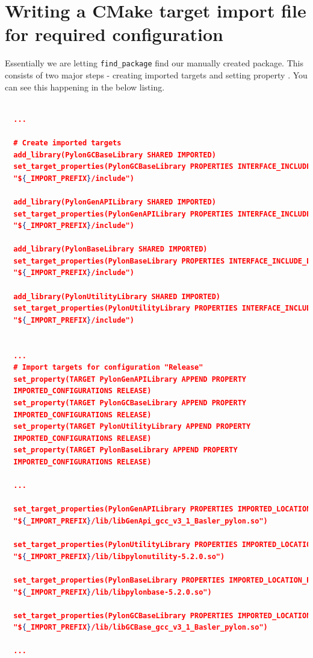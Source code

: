 \documentclass[a4paper, 12pt, oneside]{report}
\begin{document}
  \section{Writing a CMake target import file for required configuration}
  
  Essentially we are letting \texttt{find\_package} \cite{findpackageCMake302Documentation-2020-02-20} find our manually created package. This consists of two major steps - creating imported targets \cite{ExportingandImportingTargetsWikiCMakeCommunityGitLab-2020-02-20} and setting property \cite{setpropertyCMake302Documentation-2020-02-20}. You can see this happening in the below listing.
   
  \begin{lstlisting}[language=json,firstnumber=1] 
  
  ...
  
  # Create imported targets 
  add_library(PylonGCBaseLibrary SHARED IMPORTED)
  set_target_properties(PylonGCBaseLibrary PROPERTIES INTERFACE_INCLUDE_DIRECTORIES 
  "${_IMPORT_PREFIX}/include")
  
  add_library(PylonGenAPILibrary SHARED IMPORTED)
  set_target_properties(PylonGenAPILibrary PROPERTIES INTERFACE_INCLUDE_DIRECTORIES
  "${_IMPORT_PREFIX}/include")
  
  add_library(PylonBaseLibrary SHARED IMPORTED)
  set_target_properties(PylonBaseLibrary PROPERTIES INTERFACE_INCLUDE_DIRECTORIES
  "${_IMPORT_PREFIX}/include")
  
  add_library(PylonUtilityLibrary SHARED IMPORTED)
  set_target_properties(PylonUtilityLibrary PROPERTIES INTERFACE_INCLUDE_DIRECTORIES 
  "${_IMPORT_PREFIX}/include")
  
  
  ...
  # Import targets for configuration "Release"
  set_property(TARGET PylonGenAPILibrary APPEND PROPERTY 
  IMPORTED_CONFIGURATIONS RELEASE)
  set_property(TARGET PylonGCBaseLibrary APPEND PROPERTY 
  IMPORTED_CONFIGURATIONS RELEASE)
  set_property(TARGET PylonUtilityLibrary APPEND PROPERTY 
  IMPORTED_CONFIGURATIONS RELEASE)
  set_property(TARGET PylonBaseLibrary APPEND PROPERTY 
  IMPORTED_CONFIGURATIONS RELEASE)
  
  ...
  
  set_target_properties(PylonGenAPILibrary PROPERTIES IMPORTED_LOCATION_RELEASE
  "${_IMPORT_PREFIX}/lib/libGenApi_gcc_v3_1_Basler_pylon.so")   
  
  set_target_properties(PylonUtilityLibrary PROPERTIES IMPORTED_LOCATION_RELEASE
  "${_IMPORT_PREFIX}/lib/libpylonutility-5.2.0.so")
  
  set_target_properties(PylonBaseLibrary PROPERTIES IMPORTED_LOCATION_RELEASE
  "${_IMPORT_PREFIX}/lib/libpylonbase-5.2.0.so")
  
  set_target_properties(PylonGCBaseLibrary PROPERTIES IMPORTED_LOCATION_RELEASE
  "${_IMPORT_PREFIX}/lib/libGCBase_gcc_v3_1_Basler_pylon.so")
  
  ...
  \end{lstlisting} 
\end{document}
